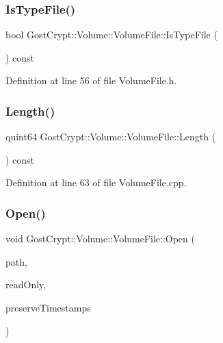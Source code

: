 \subsubsection{\texorpdfstring{Is\+Type\+File()}{IsTypeFile()}}
{\footnotesize\ttfamily bool Gost\+Crypt\+::\+Volume\+::\+Volume\+File\+::\+Is\+Type\+File (\begin{DoxyParamCaption}{ }\end{DoxyParamCaption}) const\hspace{0.3cm}{\ttfamily [inline]}}



Definition at line 56 of file Volume\+File.\+h.

\mbox{\label{class_gost_crypt_1_1_volume_1_1_volume_file_aadde0ae09820b7315bc2db39bdb6c10a}} 
\subsubsection{\texorpdfstring{Length()}{Length()}}
{\footnotesize\ttfamily quint64 Gost\+Crypt\+::\+Volume\+::\+Volume\+File\+::\+Length (\begin{DoxyParamCaption}{ }\end{DoxyParamCaption}) const}



Definition at line 63 of file Volume\+File.\+cpp.

\mbox{\label{class_gost_crypt_1_1_volume_1_1_volume_file_a85139895e9f20d58fd3c35086001053f}} 
\subsubsection{\texorpdfstring{Open()}{Open()}}
{\footnotesize\ttfamily void Gost\+Crypt\+::\+Volume\+::\+Volume\+File\+::\+Open (\begin{DoxyParamCaption}\item[{const Q\+File\+Info}]{path,  }\item[{bool}]{read\+Only,  }\item[{bool}]{preserve\+Timestamps }\end{DoxyParamCaption})}



